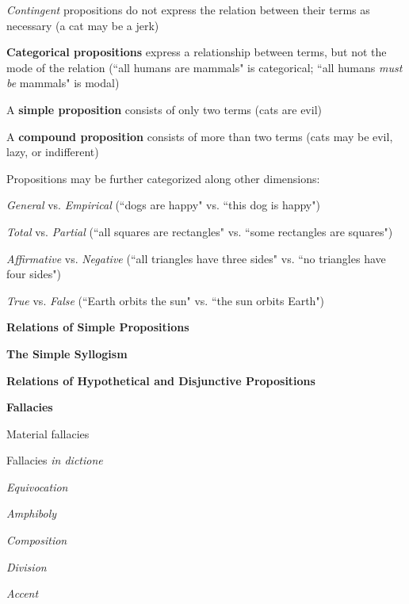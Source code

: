 \documentclass{report}
\begin{document}
\begin{outline}
\begin{outline}
\begin{outline}
\begin{outline}
      \end{outline}
    \item \textit{Contingent} propositions do not express the relation between their terms as necessary (a cat may be a jerk)
    \end{outline}
    \item {\bf Categorical propositions} express a relationship between terms, but not the mode of the relation (``all humans are mammals" is categorical; ``all humans \textit{must be} mammals" is modal)
    \item A {\bf simple proposition} consists of only two terms (cats are evil)
    \item A {\bf compound proposition} consists of more than two terms (cats may be evil, lazy, or indifferent)
    \item Propositions may be further categorized along other dimensions:
      \begin{outline}
        \item \textit{General} vs. \textit{Empirical} (``dogs are happy" vs. ``this dog is happy")
        \item \textit{Total} vs. \textit{Partial} (``all squares are rectangles" vs. ``some rectangles are squares")
        \item \textit{Affirmative} vs. \textit{Negative} (``all triangles have three sides" vs. ``no triangles have four sides")
        \item \textit{True} vs. \textit{False} (``Earth orbits the sun" vs. ``the sun orbits Earth")
      \end{outline}
  \end{outline}
  \item {\bf Relations of Simple Propositions}
  \item {\bf The Simple Syllogism}
  \item {\bf Relations of Hypothetical and Disjunctive Propositions}
  \item {\bf Fallacies}
  \begin{outline}
  \item Material fallacies
  \item Fallacies \textit{in dictione}
    \begin{outline}
    \item \textit{Equivocation}
    \item \textit{Amphiboly}
    \item \textit{Composition}
    \item \textit{Division}
    \item \textit{Accent}

\end{outline}
\end{outline}
\end{outline}
\end{document}
